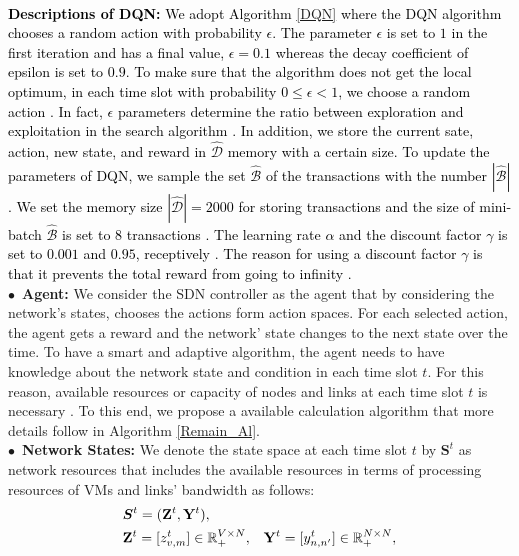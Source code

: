 \documentclass[20pt,twocolumn]{IEEEtran}
\begin{document}
\\\textcolor{black}{\textbf{Descriptions of DQN:}
We adopt Algorithm  \ref{DQN}  where the DQN algorithm chooses a random action with probability $\epsilon$. The parameter $\epsilon$ is set to $1$ in the first iteration and  has a final value, $\epsilon=0.1$ whereas the decay coefficient of epsilon is set to $0.9$.  To make sure that the algorithm does not get the local optimum, in each time slot with probability $0 \le \epsilon < 1$, we choose a random action \cite{tokic2011value}. In fact, $\epsilon$  parameters determine the ratio between exploration and exploitation in the search algorithm \cite{sutton2018reinforcement}. In addition, we store the current sate, action, new state, and reward in $\mathcal{\hat{D}}$ memory with a certain size. To update the parameters of  DQN, we sample the set $\hat{\mathcal{B}}$  of the  transactions with the number $|\hat{\mathcal{B}}|$. We set the memory size $|\hat{\mathcal{D}}|=2000$ for storing transactions and 
the size of mini-batch $\hat{\mathcal{B}}$ is set to  $8$  transactions \cite{fu2019dynamic}.  
The learning rate $\alpha$ and the discount factor $\gamma$ is set to  $0.001$ and $0.95$, receptively \cite{10.1145/3326285.3329056,tokic2011value}. 
The reason for using a discount factor $\gamma$ is that it prevents the total reward from going to infinity \cite{van2007reinforcement}.} \\
$\bullet$~\textbf{Agent:} We consider the SDN controller as the agent that by  considering the network's states,  chooses the actions form  action spaces. For each selected action, the agent gets a reward and the network' state changes to  the next state over the time. To have a smart and adaptive algorithm, the agent needs to have knowledge about the network state and condition in each time slot $t$. For this reason, available resources or capacity of nodes and links at each time slot $t$ is necessary \cite{pei2019optimal}. To this end, we propose a available calculation algorithm that more details follow in Algorithm
\ref{Remain_Al}.\\
$\bullet$~\textbf{Network States:} We denote the state space at each time slot $t$  by $\boldsymbol{S}^{t}$ as  network resources
that includes the available resources in terms of processing resources of VMs and links' bandwidth as follows:	
\begin{align}
&\boldsymbol{S}^{t}=(\bold{Z}^{t},\bold{Y}^{t}),\\ \nonumber &\bold{Z}^{t}=[z_{v,m}^{t}]\in \Bbb{R}_{+}^{V\times N},	&\bold{Y}^{t}=[y_{{n,n'}}^{t}]\in\Bbb{R}_{+}^{N\times N},
\end{align}
\end{document}
